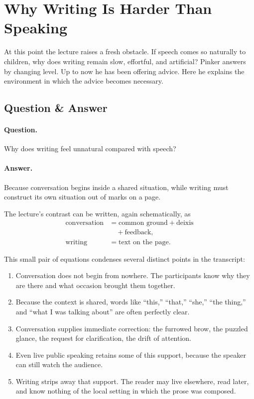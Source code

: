 \section{Why Writing Is Harder Than Speaking}

At this point the lecture raises a fresh obstacle. If speech comes so naturally to children, why does writing remain slow, effortful, and artificial? Pinker answers by changing level. Up to now he has been offering advice. Here he explains the environment in which the advice becomes necessary.

\subsection{Question \& Answer}

\paragraph{Question.} Why does writing feel unnatural compared with speech?

\paragraph{Answer.} Because conversation begins inside a shared situation, while writing must construct its own situation out of marks on a page.

The lecture's contrast can be written, again schematically, as
\begin{align}
\text{conversation} &= \text{common ground} + \text{deixis} \\
&\quad + \text{feedback}, \\
\text{writing} &= \text{text on the page}.
\end{align}

This small pair of equations condenses several distinct points in the transcript:
\begin{enumerate}
\item Conversation does not begin from nowhere. The participants know why they are there and what occasion brought them together.
\item Because the context is shared, words like ``this,'' ``that,'' ``she,'' ``the thing,'' and ``what I was talking about'' are often perfectly clear.
\item Conversation supplies immediate correction: the furrowed brow, the puzzled glance, the request for clarification, the drift of attention.
\item Even live public speaking retains some of this support, because the speaker can still watch the audience.
\item Writing strips away that support. The reader may live elsewhere, read later, and know nothing of the local setting in which the prose was composed.
\end{enumerate}

